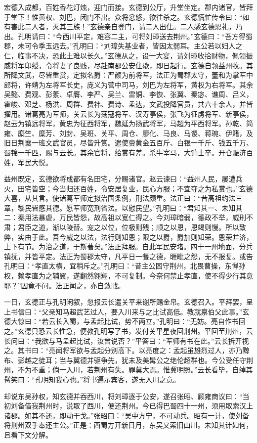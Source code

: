 宏德入成都，百姓香花灯烛，迎门而接。玄德到公厅，升堂坐定。郡内诸官，皆拜于堂下！惟黄权、刘巴，闭门不出。众将忿怒，欲往杀之。玄德慌忙传令曰：“如有害此二人者，灭其三族！”玄德亲自登门，请二人出仕。二人感玄德恩礼，乃出。孔明请曰：“今西川平定，难容二主，可将刘璋送去荆州。”玄德曰：“吾方得蜀郡，未可令季玉远去。”孔明曰：“刘璋失基业者，皆因太弱耳。主公若以妇人之仁，临事不决，恐此土难以长久。”玄德从之，设一大宴，请刘璋收拾财物，佩领振威将军印绶，令将妻子良贱，尽赴南郡公安住歇，即日起行。玄德自领益州牧。其所降文武，尽皆重赏，定拟名爵：严颜为前将军，法正为蜀郡太守，董和为掌军中郎将，许靖为左将军长史，庞义为营中司马，刘巴为左将军，黄权为右将军。其余吴懿、费观、彭羕、卓膺、李严、吴兰、雷铜、李恢、张翼、秦宓、谯周、吕义，霍峻、邓芝、杨洪、周群、费祎、费诗、孟达，文武投降官员，共六十余人，并皆擢用。诸葛亮为军师，关云长为荡寇将军、汉寿亭侯，张飞为征虏将军、新亭侯，赵云为镇远将军，黄忠为征西将军，魏延为扬武将军，马超为平西将军。孙乾、简雍、糜竺、糜芳、刘封、吴班、关平、周仓、廖化、马良、马谡、蒋琬、伊籍，及旧日荆襄一班文武官员，尽皆升赏。遣使赍黄金五百斤、白银一千斤、钱五千万、蜀锦一千匹，赐与云长。其余官将，给赏有差。杀牛宰马，大饷士卒。开仓赈济百姓，军民大悦。

益州既定，玄德欲将成都有名田宅，分赐诸官。赵云谏曰：“益州人民，屡遭兵火，田宅皆空；今当归还百姓，令安居复业，民心方服；不宜夺之为私赏也。”玄德大喜，从其言。使诸葛军师定拟治国条例，刑法颇重。法正曰：“昔高祖约法三章，黎民皆感其德。愿军师宽刑省法。以慰民望。”孔明曰：“君知其一、未知其二：秦用法暴虐，万民皆怨，故高祖以宽仁得之。今刘璋暗弱，德政不举，威刑不肃；君臣之道，渐以陵替。宠之以位，位极则残；顺之以恩，恩竭则慢。所以致弊，实由于此。吾今威之以法，法行则知恩；限之以爵，爵加则知荣。恩荣并济，上下有节。为治之道，于斯著矣。”法正拜服。自此军民安堵。四十一州地面，分兵镇抚，并皆平定。法正为蜀郡太守，凡平日一餐之德，睚毗之怨，无不报复。或告孔明曰：“孝直太横，宜稍斥之。”孔明曰：“昔主公困守荆州，北畏曹操，东惮孙权，赖孝直为之辅翼，遂翻然翱翔，不可复制。今奈何禁止孝直，使不得少行其意耶？”因竟不问。法正闻之，亦自敛戢。

一日，玄德正与孔明闲叙，忽报云长遣关平来谢所赐金帛。玄德召入。平拜罢，呈上书信曰：“父亲知马超武艺过人，要入川来与之比试高低。教就禀伯父此事。”玄德大惊曰：“若云长入蜀，与孟起比试，势不两立。”孔明曰：“无妨。亮自作书回之。”玄德只恐云长性急，便教孔明写了书，发付关平星夜回荆州。平回至荆州，云长问曰：“我欲与马孟起比试，汝曾说否？”平答曰：“军师有书在此。”云长拆开视之。其书曰：“亮闻将军欲与孟起分别高下。以亮度之：孟起虽雄烈过人，亦乃黥布、彭越之徒耳；当与翼德并驱争先，犹未及美髯公之绝伦超群也。今公受任守荆州，不为不重；倘一入川，若荆州有失。罪莫大焉。惟冀明照。”云长看毕，自绰其髯笑曰：“孔明知我心也。”将书遍示宾客，遂无入川之意。

却说东吴孙权，知玄德并吞西川，将刘璋逐于公安，遂召张昭、顾雍商议曰：“当初刘备借我荆州时，说取了西川，便还荆州。今已得巴蜀四十一州，须用取索汉上诸郡。如其不还，即动干戈。”张昭曰：“吴中方宁，不可动兵。昭有一计，使刘备将荆州双手奉还主公。”正是：西蜀方开新日月，东吴又索旧山川。未知其计如何，且看下文分解。